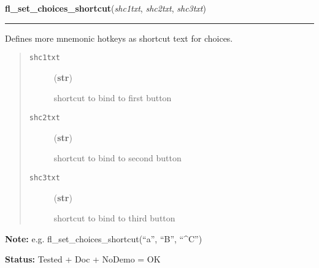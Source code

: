 \hspace{.8\funcindent}\begin{boxedminipage}{\funcwidth}

    \raggedright \textbf{fl\_set\_choices\_shortcut}(\textit{shc1txt}, \textit{shc2txt}, \textit{shc3txt})

    \vspace{-1.5ex}

    \rule{\textwidth}{0.5\fboxrule}
\setlength{\parskip}{2ex}

Defines more mnemonic hotkeys as shortcut text for choices.
%
\begin{quote}
%
\begin{description}
\item[{\texttt{shc1txt}}] \leavevmode (\textbf{str})

shortcut to bind to first button

\item[{\texttt{shc2txt}}] \leavevmode (\textbf{str})

shortcut to bind to second button

\item[{\texttt{shc3txt}}] \leavevmode (\textbf{str})

shortcut to bind to third button

\end{description}

\end{quote}
\setlength{\parskip}{1ex}
\textbf{Note:} 
e.g. fl\_set\_choices\_shortcut(``a'', ``B'', ``\textasciicircum{}C'')


\textbf{Status:} 
Tested + Doc + NoDemo = OK


    \end{boxedminipage}

    \label{xformslib:flgoodies:fl_set_choices_shortcut}

    \vspace{0.5ex}

